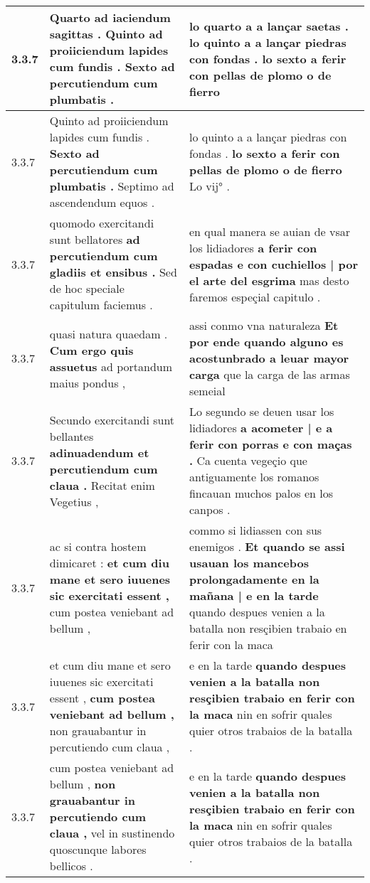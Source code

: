 \begin{tabular}{|p{1cm}|p{6.5cm}|p{6.5cm}|}
3.3.7 & Quarto ad iaciendum sagittas . \textbf{ Quinto ad proiiciendum lapides cum fundis . } Sexto ad percutiendum cum plumbatis . & lo quarto a a lançar saetas . \textbf{ lo quinto a a lançar piedras con fondas . } lo sexto a ferir con pellas de plomo o de fierro \\\hline
3.3.7 & Quinto ad proiiciendum lapides cum fundis . \textbf{ Sexto ad percutiendum cum plumbatis . } Septimo ad ascendendum equos . & lo quinto a a lançar piedras con fondas . \textbf{ lo sexto a ferir con pellas de plomo o de fierro } Lo vij° . \\\hline
3.3.7 & quomodo exercitandi sunt bellatores \textbf{ ad percutiendum cum gladiis et ensibus . } Sed de hoc speciale capitulum faciemus . & en qual manera se auian de vsar los lidiadores \textbf{ a ferir con espadas e con cuchiellos | por el arte del esgrima } mas desto faremos espeçial capitulo . \\\hline
3.3.7 & quasi natura quaedam . \textbf{ Cum ergo quis assuetus } ad portandum maius pondus , & assi conmo vna naturaleza \textbf{ Et por ende quando alguno es acostunbrado a leuar mayor carga } que la carga de las armas semeial \\\hline
3.3.7 & Secundo exercitandi sunt bellantes \textbf{ adinuadendum et percutiendum cum claua . } Recitat enim Vegetius , & Lo segundo se deuen usar los lidiadores \textbf{ a acometer | e a ferir con porras e con maças . } Ca cuenta vegeçio que antiguamente los romanos fincauan muchos palos en los canpos . \\\hline
3.3.7 & ac si contra hostem dimicaret : \textbf{ et cum diu mane et sero iuuenes sic exercitati essent , } cum postea veniebant ad bellum , & commo si lidiassen con sus enemigos . \textbf{ Et quando se assi usauan los mancebos prolongadamente en la mañana | e en la tarde } quando despues venien a la batalla non resçibien trabaio en ferir con la maca \\\hline
3.3.7 & et cum diu mane et sero iuuenes sic exercitati essent , \textbf{ cum postea veniebant ad bellum , } non grauabantur in percutiendo cum claua , & e en la tarde \textbf{ quando despues venien a la batalla non resçibien trabaio en ferir con la maca } nin en sofrir quales quier otros trabaios de la batalla . \\\hline
3.3.7 & cum postea veniebant ad bellum , \textbf{ non grauabantur in percutiendo cum claua , } vel in sustinendo quoscunque labores bellicos . & e en la tarde \textbf{ quando despues venien a la batalla non resçibien trabaio en ferir con la maca } nin en sofrir quales quier otros trabaios de la batalla . \\\hline

\end{tabular}
